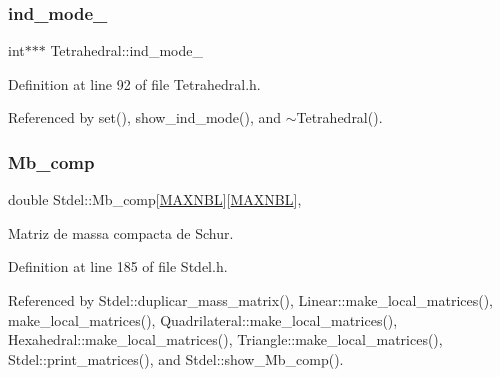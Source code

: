 \mbox{\label{classTetrahedral_a616962833d192dcd2502d490c492a4ef}} 
\subsubsection{\texorpdfstring{ind\+\_\+mode\+\_\+}{ind\_mode\_}}
{\footnotesize\ttfamily int$\ast$$\ast$$\ast$ Tetrahedral\+::ind\+\_\+mode\+\_\+\hspace{0.3cm}{\ttfamily [private]}}



Definition at line 92 of file Tetrahedral.\+h.



Referenced by set(), show\+\_\+ind\+\_\+mode(), and $\sim$\+Tetrahedral().

\mbox{\label{classStdel_aa1627cb39fa5da75764809412159c825}} 
\subsubsection{\texorpdfstring{Mb\+\_\+comp}{Mb\_comp}}
{\footnotesize\ttfamily double Stdel\+::\+Mb\+\_\+comp\mbox{[}\hyperlink{MyOptions_8h_aed8828a63ec0a2a0461b7c9ed39dd648}{M\+A\+X\+N\+BL}\mbox{]}\mbox{[}\hyperlink{MyOptions_8h_aed8828a63ec0a2a0461b7c9ed39dd648}{M\+A\+X\+N\+BL}\mbox{]}\hspace{0.3cm}{\ttfamily [protected]}, {\ttfamily [inherited]}}



Matriz de massa compacta de Schur. 



Definition at line 185 of file Stdel.\+h.



Referenced by Stdel\+::duplicar\+\_\+mass\+\_\+matrix(), Linear\+::make\+\_\+local\+\_\+matrices(), make\+\_\+local\+\_\+matrices(), Quadrilateral\+::make\+\_\+local\+\_\+matrices(), Hexahedral\+::make\+\_\+local\+\_\+matrices(), Triangle\+::make\+\_\+local\+\_\+matrices(), Stdel\+::print\+\_\+matrices(), and Stdel\+::show\+\_\+\+Mb\+\_\+comp().

\mbox{\label{classStdel_acc685141e80bcce9703e37f32cc5c42c}} 
